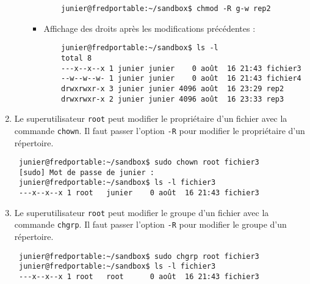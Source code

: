 \documentclass[
  11pt,
]{article}
\newcounter{prop}
\begin{document}
\begin{enumerate}
\begin{itemize}
\begin{itemize}
\begin{verbatim}
    junier@fredportable:~/sandbox$ chmod -R g-w rep2
\end{verbatim}
    \item
      Affichage des droits après les modifications précédentes :

\begin{verbatim}
    junier@fredportable:~/sandbox$ ls -l
    total 8
    ---x--x--x 1 junier junier    0 août  16 21:43 fichier3
    --w--w--w- 1 junier junier    0 août  16 21:43 fichier4
    drwxrwxr-x 3 junier junier 4096 août  16 23:29 rep2
    drwxrwxr-x 2 junier junier 4096 août  16 23:33 rep3
\end{verbatim}
    \end{itemize}
  \end{itemize}
\item
  Le superutilisateur \texttt{root} peut modifier le propriétaire d'un
  fichier avec la commande \texttt{chown}. Il faut passer l'option
  \texttt{-R} pour modifier le propriétaire d'un répertoire.

\begin{verbatim}
 junier@fredportable:~/sandbox$ sudo chown root fichier3
 [sudo] Mot de passe de junier : 
 junier@fredportable:~/sandbox$ ls -l fichier3
 ---x--x--x 1 root   junier    0 août  16 21:43 fichier3
\end{verbatim}
\item
  Le superutilisateur \texttt{root} peut modifier le groupe d'un fichier
  avec la commande \texttt{chgrp}. Il faut passer l'option \texttt{-R}
  pour modifier le groupe d'un répertoire.

\begin{verbatim}
 junier@fredportable:~/sandbox$ sudo chgrp root fichier3
 junier@fredportable:~/sandbox$ ls -l fichier3
 ---x--x--x 1 root   root      0 août  16 21:43 fichier3
\end{verbatim}
\end{enumerate}
\end{document}
